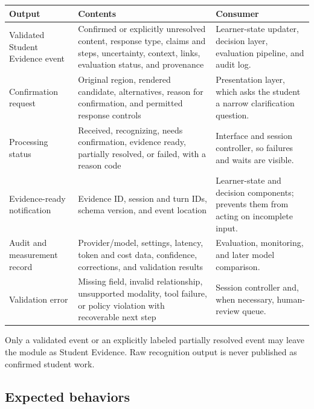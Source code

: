\documentclass[11pt]{article}
\begin{document}
\noindent\begin{tabularx}{\textwidth}{@{}p{}p{}X@{}}
\toprule
\textbf{Output} & \textbf{Contents} & \textbf{Consumer} \\
\midrule
Validated Student Evidence event & Confirmed or explicitly unresolved content, response type, claims and steps, uncertainty, context, links, evaluation status, and provenance & Learner-state updater, decision layer, evaluation pipeline, and audit log. \\
Confirmation request & Original region, rendered candidate, alternatives, reason for confirmation, and permitted response controls & Presentation layer, which asks the student a narrow clarification question. \\
Processing status & Received, recognizing, needs confirmation, evidence ready, partially resolved, or failed, with a reason code & Interface and session controller, so failures and waits are visible. \\
Evidence-ready notification & Evidence ID, session and turn IDs, schema version, and event location & Learner-state and decision components; prevents them from acting on incomplete input. \\
Audit and measurement record & Provider/model, settings, latency, token and cost data, confidence, corrections, and validation results & Evaluation, monitoring, and later model comparison. \\
Validation error & Missing field, invalid relationship, unsupported modality, tool failure, or policy violation with recoverable next step & Session controller and, when necessary, human-review queue. \\
\bottomrule
\end{tabularx}

Only a validated event or an explicitly labeled partially resolved event may leave the module as Student Evidence. Raw recognition output is never published as confirmed student work.

\subsection{Expected behaviors}
\end{document}
